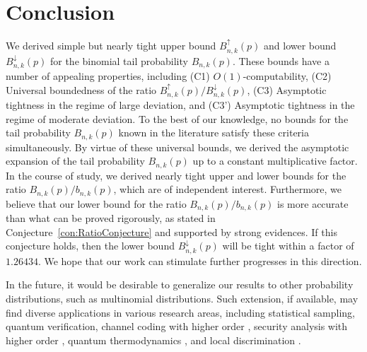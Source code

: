 \documentclass[aop]{imsart}
\theoremstyle{plain}
\theoremstyle{remark}
\newcommand{\1}{\operatorname{\uppercase\expandafter{\romannumeral1}}}
\newcommand{\2}{\operatorname{\uppercase\expandafter{\romannumeral2}}}
\newcommand{\3}{\operatorname{\uppercase\expandafter{\romannumeral3}}}
\newcommand{\4}{\operatorname{\uppercase\expandafter{\romannumeral4}}}
\newcommand{\5}{\operatorname{\uppercase\expandafter{\romannumeral5}}}
\newcommand{\6}{\operatorname{\uppercase\expandafter{\romannumeral6}}}
\newcommand{\7}{\operatorname{\uppercase\expandafter{\romannumeral7}}}
\newcommand{\8}{\operatorname{\uppercase\expandafter{\romannumeral8}}}
\newcommand{\9}{\operatorname{\uppercase\expandafter{\romannumeral9}}}
\newcommand{\cref}[1]{Conjecture~\ref{#1}}
\begin{document}
\section{Conclusion}\label{sec:conclusion}
We derived simple but nearly tight upper bound $B_{n,k}^{\uparrow}(p)$ and lower bound $B_{n,k}^{\downarrow}(p)$
for the binomial tail probability $B_{n,k}(p)$. These bounds have a number of appealing properties, including 
(C1) $O(1)$-computability, 
(C2) Universal boundedness of the ratio $B_{n,k}^{\uparrow}(p) /B_{n,k}^{\downarrow}(p)$, 
(C3) Asymptotic tightness in the regime of large deviation, and (C3') Asymptotic tightness in the regime of moderate deviation. To the best of our knowledge, no bounds for the tail probability $B_{n,k}(p)$ known in the literature satisfy  these criteria simultaneously. By virtue of these universal  bounds, we  derived the asymptotic expansion of the tail probability $B_{n,k}(p)$
up to a constant multiplicative factor. In the course of study, we derived nearly tight upper and lower bounds for  the ratio $B_{n,k}(p)/b_{n,k}(p)$, which are of independent interest. Furthermore, we believe that our lower bound for the ratio $B_{n,k}(p)/b_{n,k}(p)$ is more accurate than what can be proved rigorously, as stated in \cref{con:RatioConjecture} and supported by strong evidences. If this conjecture holds, then the lower bound $B_{n,k}^{\downarrow}(p)$ will be tight within a factor of $1.26434$. We hope that our work can stimulate further progresses in this direction. 

In the future, it would be desirable to generalize our results to other probability distributions, such as multinomial distributions. Such extension, if available, may find diverse applications in various research areas, including statistical sampling, quantum verification, channel coding with higher order \cite{Moul17,Ferr21,Haya18}, 
security analysis with higher order \cite{Haya18,Haya19},
quantum thermodynamics \cite{TajiH17,ItoH18}, and local discrimination \cite{HayaO17}.
\end{document}
